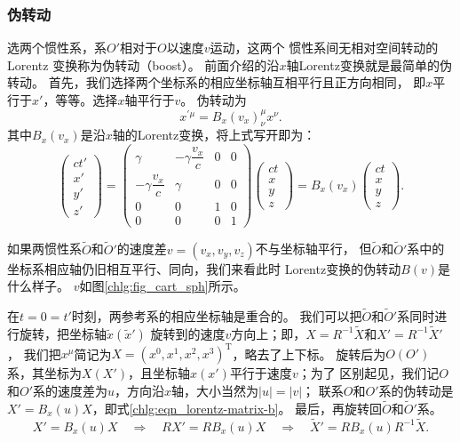 \subsubsection{伪转动}
选两个惯性系，系$O'$相对于$O$以速度$v$运动，这两个
惯性系间无相对空间转动的 Lorentz 变换称为伪转动（boost）。
前面介绍的沿$x$轴Lorentz变换就是最简单的伪转动。
首先，我们选择两个坐标系的相应坐标轴互相平行且正方向相同，
即$x$平行于$x'$，等等。选择$x$轴平行于$v$。
伪转动为
\begin{equation}\label{chlg:eqn_lorentz-matrix-b}
    x^{\prime \mu} = B_x(v_x) ^\mu _{\nu} x^\nu .
\end{equation}
其中$B_x(v_x)$是沿$x$轴的Lorentz变换，将上式写开即为：
\begin{equation}
	\begin{pmatrix}
		ct'\\x'\\y'\\z'
	\end{pmatrix} =
	\begin{pmatrix}
		\gamma & -\gamma \dfrac{v_x}{c}  & 0 & 0 \\
		-\gamma \dfrac{v_x}{c} & \gamma  & 0 & 0 \\
		0 & 0 & 1 & 0 \\
		0 & 0 & 0 & 1
	\end{pmatrix}
	\begin{pmatrix}
		ct\\x\\y\\z
	\end{pmatrix} = B_x(v_x)
	\begin{pmatrix}
		ct\\x\\y\\z
	\end{pmatrix}.
\end{equation}

如果两惯性系$\tilde{O}$和$\tilde{O}'$的速度差$v=(v_x,v_y,v_z)$不与坐标轴平行，
但$\tilde{O}$和$\tilde{O}'$系中的坐标系相应轴仍旧相互平行、同向，我们来看此时
Lorentz变换的伪转动$B(v)$是什么样子。
$v$如图\ref{chlg:fig_cart_sph}所示。

在$t=0=t'$时刻，两参考系的相应坐标轴是重合的。
我们可以把$\tilde{O}$和$\tilde{O}'$系同时进行旋转，把坐标轴$\tilde{x}(\tilde{x}')$
旋转到的速度$v$方向上；即，$X=R^{-1}\tilde{X}$和$X'=R^{-1}\tilde{X}'$，
我们把$x^\mu$简记为$X=(x^0,x^1,x^2,x^3)^{\mathrm{T}}$，略去了上下标。
旋转后为$O(O')$系，其坐标为$X(X')$，且坐标轴$x(x')$平行于速度$v$；为了
区别起见，我们记$O$和$O'$系的速度差为$u$，方向沿$x$轴，大小当然为$|u|=|v|$；
联系$O$和$O'$系的伪转动是$X' = {B_x}(u)X$，即式\eqref{chlg:eqn_lorentz-matrix-b}。
最后，再旋转回$\tilde{O}$和$\tilde{O}'$系。
\begin{equation} 
    X' = {B_x}(u)X {\quad \Rightarrow\quad } RX' = R{B_x}(u)X
    {\quad \Rightarrow\quad }  \tilde{X}' = R{B_x}(u)R^{-1}\tilde{X} .
\end{equation}

